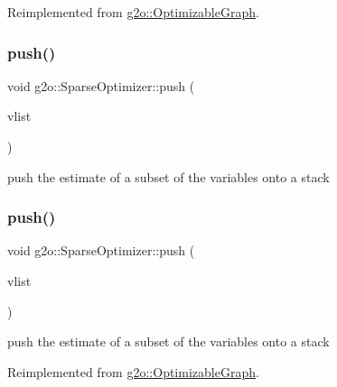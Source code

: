 Reimplemented from \mbox{\hyperlink{structg2o_1_1_optimizable_graph_a8487f537b16ac7a2ee416ea294a1e22e}{g2o\+::\+Optimizable\+Graph}}.

\mbox{\label{classg2o_1_1_sparse_optimizer_a08833d6f9ae487f5608f6113f3635b6b}} 
\subsubsection{\texorpdfstring{push()}{push()}\hspace{0.1cm}{\footnotesize\ttfamily [1/3]}}
{\footnotesize\ttfamily void g2o\+::\+Sparse\+Optimizer\+::push (\begin{DoxyParamCaption}\item[{\mbox{\hyperlink{classg2o_1_1_hyper_graph_a9339534c99300a0ddac87ba976ef188c}{Sparse\+Optimizer\+::\+Vertex\+Container}} \&}]{vlist }\end{DoxyParamCaption})}



push the estimate of a subset of the variables onto a stack 

\mbox{\label{classg2o_1_1_sparse_optimizer_ac9a5fd64764e61d99e8a90734118a8bf}} 
\subsubsection{\texorpdfstring{push()}{push()}\hspace{0.1cm}{\footnotesize\ttfamily [2/3]}}
{\footnotesize\ttfamily void g2o\+::\+Sparse\+Optimizer\+::push (\begin{DoxyParamCaption}\item[{\mbox{\hyperlink{classg2o_1_1_hyper_graph_a703938cdb4bb636860eed55a2489d70c}{Hyper\+Graph\+::\+Vertex\+Set}} \&}]{vlist }\end{DoxyParamCaption})\hspace{0.3cm}{\ttfamily [virtual]}}



push the estimate of a subset of the variables onto a stack 



Reimplemented from \mbox{\hyperlink{structg2o_1_1_optimizable_graph_a1d65a6854936147a92f7ba664302993e}{g2o\+::\+Optimizable\+Graph}}.

